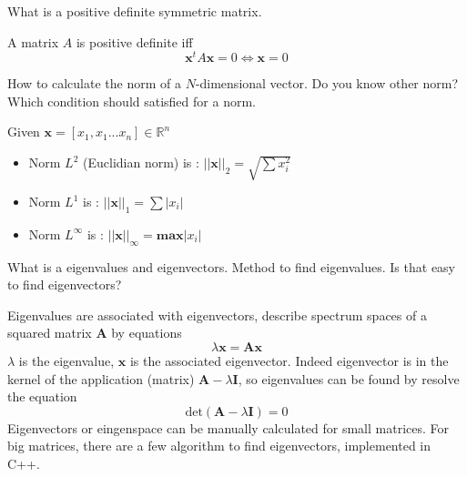 \documentclass{exam}%
\newcommand{\mathvec}[1]{\textbf{#1}}
\begin{document}
\begin{questions}
\question What is a positive definite symmetric matrix.
\begin{solution}[.2in]
A matrix $A$ is positive definite iff 
\[
\mathvec{x}^t A \mathvec{x} = 0 \Longleftrightarrow \mathvec{x}=0
\]
\end{solution}

\question How to calculate the norm of a $N$-dimensional vector. Do you know other norm? Which condition should satisfied for a norm.
\begin{solution}[.2in]
Given $\mathvec{x}=[x_1,x_1 ... x_n] \in \mathbb{R}^n$
\begin{itemize}
	\item Norm $L^2$ (Euclidian norm) is : $||\textbf{x}||_{2} = \sqrt{\sum x^2_i} $
	\item Norm $L^1$ is : $||\textbf{x}||_{1} = \sum |x_i|$
	\item Norm $L^\infty$ is : $||\textbf{x}||_{\infty} = \textbf{max} |x_i|$
\end{itemize}
\end{solution}

\question What is a eigenvalues and eigenvectors. Method to find eigenvalues. Is that easy to find eigenvectors?
\begin{solution}[.2in]
Eigenvalues are associated with eigenvectors, describe spectrum spaces of a squared matrix $\mathvec{A}$ by equations 
\[
\lambda\mathvec{x} = \mathvec{A}\mathvec{x}
\]
$\lambda$ is the eigenvalue, $\mathvec{x}$ is the associated eigenvector. Indeed eigenvector is in the kernel of the application (matrix) $\mathvec{A}-\lambda\mathvec{I}$, so eigenvalues can be found by resolve the equation
\[
\text{det}(\mathvec{A}-\lambda\mathvec{I})=0
\]
Eigenvectors or eingenspace can be manually calculated for small matrices. For big matrices, there are a few algorithm to find eigenvectors, implemented in C++.
\end{solution}


\end{questions}
\end{document}

